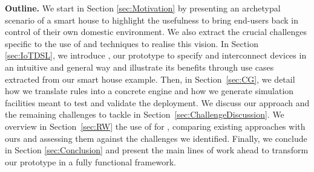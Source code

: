 
\noindent
\textbf{Outline.} We start in Section \ref{sec:Motivation} by presenting an archetypal scenario of a smart house to highlight the usefulness to bring end-users back in control of their own domestic \IOT environment. We also extract the crucial \IOT challenges specific to the use of \DSLS and \MDE techniques to realise this vision. In Section \ref{sec:IoTDSL}, we introduce \IOTDSL, our prototype \DSL to specify and interconnect devices in an intuitive and general way and illustrate its benefits through use cases extracted from our smart house example. Then, in Section~\ref{sec:CG}, we detail how we translate \IOTDSL rules into a concrete \CEP engine and how we generate simulation facilities meant to test and validate the \IOT deployment. We discuss our approach and the remaining challenges to tackle in Section~\ref{sec:ChallengeDiscussion}. We overview in Section~\ref{sec:RW} the use of \DSLS for \IOT, comparing existing approaches with ours and assessing them against the challenges we identified. Finally, we conclude in Section \ref{sec:Conclusion} and present the main lines of work ahead to transform our prototype in a fully functional \DSL framework.
